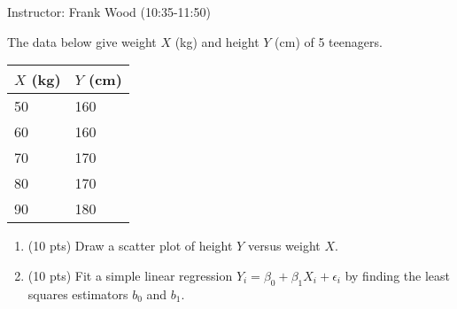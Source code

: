\documentclass[12pt]{article}
\begin{document}
 \begin{center}
  Instructor: Frank Wood (10:35-11:50) 
 \end{center}
\studentinfo
{}
\finishfirstpage



 {
 The data below give weight $X$ (kg) and height $Y$ (cm)
 of 5 teenagers.

\begin{center}
\begin{tabular}{ll}
$X$ (kg) & $Y$ (cm) \\
\hline
50&160 \\
60&160 \\
70&170 \\
80&170 \\
90&180\\
\hline
\end{tabular}
\end{center}
\begin{enumerate}
\item (10 pts) Draw a scatter plot of height $Y$ versus weight $X$.
\item (10 pts) Fit a simple linear regression $ Y_i=\beta_0+\beta_1 X_i+\epsilon_i$  by finding the least squares estimators $b_0$ and $b_1$.

\end{enumerate}

}
 { \vfill
  \answer
} {  }
\end{document}
